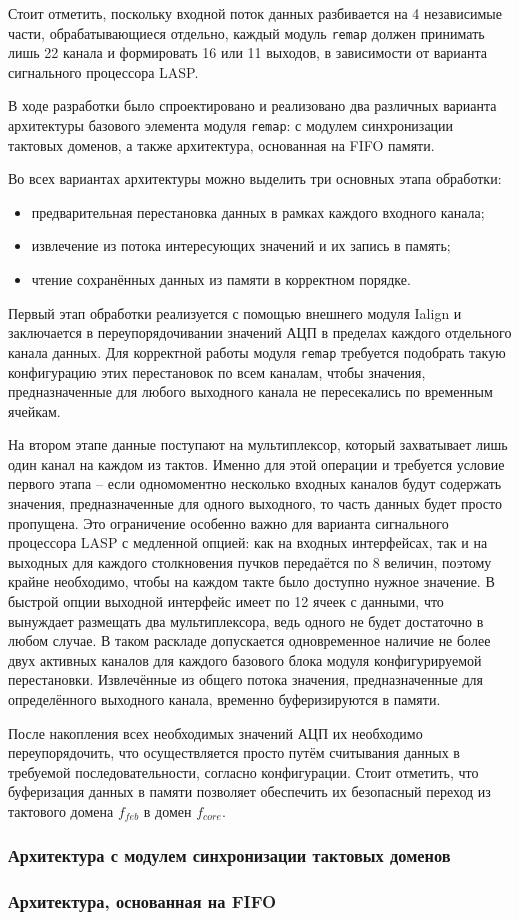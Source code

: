 Стоит отметить, поскольку входной поток данных разбивается на 4 независимые части, обрабатывающиеся отдельно, каждый модуль \texttt{remap} должен принимать лишь 22 канала и формировать 16 или 11 выходов, в зависимости от варианта сигнального процессора LASP.\par
В ходе разработки было спроектировано и реализовано два различных варианта архитектуры базового элемента модуля \texttt{remap}: с модулем синхронизации тактовых доменов, а также архитектура, основанная на FIFO памяти.\par
Во всех вариантах архитектуры можно выделить три основных этапа обработки:\par
\begin{itemize}
    \item предварительная перестановка данных в рамках каждого входного канала;
    \item извлечение из потока интересующих значений и их запись в память;
    \item чтение сохранённых данных из памяти в корректном порядке.
\end{itemize}\par
Первый этап обработки реализуется с помощью внешнего модуля Ialign и заключается в переупорядочивании значений АЦП в пределах каждого отдельного канала данных. Для корректной работы модуля \texttt{remap} требуется подобрать такую конфигурацию этих перестановок по всем каналам, чтобы значения, предназначенные для любого выходного канала не пересекались по временным ячейкам.\par
На втором этапе данные поступают на мультиплексор, который захватывает лишь один канал на каждом из тактов. Именно для этой операции и требуется условие первого этапа -- если одномоментно несколько входных каналов будут содержать значения, предназначенные для одного выходного, то часть данных будет просто пропущена. Это ограничение особенно важно для варианта сигнального процессора LASP с медленной опцией: как на входных интерфейсах, так и на выходных для каждого столкновения пучков передаётся по 8 величин, поэтому крайне необходимо, чтобы на каждом такте было доступно нужное значение. В быстрой опции выходной интерфейс имеет по 12 ячеек с данными, что вынуждает размещать два мультиплексора, ведь одного не будет достаточно в любом случае. В таком раскладе допускается одновременное наличие не более двух активных каналов для каждого базового блока модуля конфигурируемой перестановки. Извлечённые из общего потока значения, предназначенные для определённого выходного канала, временно буферизируются в памяти.\par
После накопления всех необходимых значений АЦП их необходимо переупорядочить, что осуществляется просто путём считывания данных в требуемой последовательности, согласно конфигурации. Стоит отметить, что буферизация данных в памяти позволяет обеспечить их безопасный переход из тактового домена $f_{feb}$ в домен $f_{core}$.\par

\subsubsection{Архитектура с модулем синхронизации тактовых доменов}


\subsubsection{Архитектура, основанная на FIFO}


